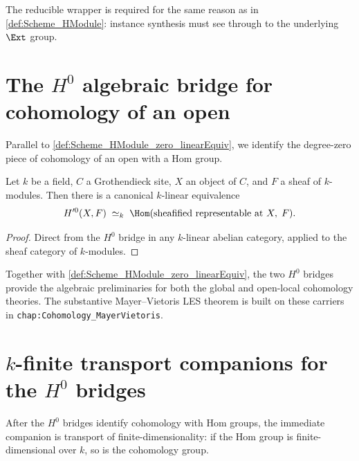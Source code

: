 \begin{remark}
  The reducible wrapper is required for the same reason as in \cref{def:Scheme_HModule}: instance synthesis must see through to the underlying \(\Ext\) group.
\end{remark}

\section{The \(H^0\) algebraic bridge for cohomology of an open}
\label{sec:hmodule_prime_zero}

Parallel to \cref{def:Scheme_HModule_zero_linearEquiv}, we identify the degree-zero piece of cohomology of an open with a Hom group.

\begin{definition}
  \label{def:Scheme_HModule_prime_zero_linearEquiv}

  Let \(k\) be a field, \(C\) a Grothendieck site, \(X\) an object of \(C\), and \(F\) a sheaf of \(k\)-modules. Then there is a canonical \(k\)-linear equivalence
  \[
    H^{\prime 0}(X, F) \;\simeq_k\; \Hom(\text{sheafified representable at }X,\; F).
  \]
\end{definition}

\begin{proof}
  
  \leanok
  Direct from the \(H^0\) bridge in any \(k\)-linear abelian category, applied to the sheaf category of \(k\)-modules.
\end{proof}

\begin{remark}
  Together with \cref{def:Scheme_HModule_zero_linearEquiv}, the two \(H^0\) bridges provide the algebraic preliminaries for both the global and open-local cohomology theories. The substantive Mayer--Vietoris LES theorem is built on these carriers in \texttt{chap:Cohomology\_MayerVietoris}.
\end{remark}

\section{\(k\)-finite transport companions for the \(H^0\) bridges}
\label{sec:HModule_finite_zero_iter038}

After the \(H^0\) bridges identify cohomology with Hom groups, the immediate companion is transport of finite-dimensionality: if the Hom group is finite-dimensional over \(k\), so is the cohomology group.

